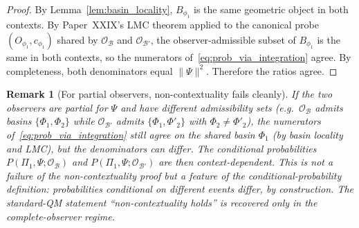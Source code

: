 \documentclass[12pt]{article}
\newtheorem{remark}[theorem]{Remark}
\newcommand{\Ocal}{\mathcal{O}}
\begin{document}
\begin{proof}
By Lemma~\ref{lem:basin_locality}, $B_{\phi_1}$ is the same geometric object in both contexts. By Paper~XXIX's LMC theorem applied to the canonical probe $(O_{\phi_1}, c_{\phi_1})$ shared by $\Ocal_{\mathcal{B}}$ and $\Ocal_{\mathcal{B}'}$, the observer-admissible subset of $B_{\phi_1}$ is the same in both contexts, so the numerators of~\eqref{eq:prob_via_integration} agree. By completeness, both denominators equal $\|\Psi\|^2$. Therefore the ratios agree.
\end{proof}

\begin{remark}[For partial observers, non-contextuality fails cleanly]\label{rem:partial_noncontextual}
If the two observers are \emph{partial} for $\Psi$ and have different admissibility sets (e.g.\ $\Ocal_\mathcal{B}$ admits basins $\{\Phi_1, \Phi_2\}$ while $\Ocal_{\mathcal{B}'}$ admits $\{\Phi_1, \Phi'_2\}$ with $\Phi_2 \neq \Phi'_2$), the numerators of~\eqref{eq:prob_via_integration} still agree on the shared basin $\Phi_1$ (by basin locality and LMC), but the denominators can differ. The conditional probabilities $P(\Pi_1, \Psi; \Ocal_{\mathcal{B}})$ and $P(\Pi_1, \Psi; \Ocal_{\mathcal{B}'})$ are then context-dependent. This is not a failure of the non-contextuality proof but a feature of the conditional-probability definition: probabilities conditional on different events differ, by construction. The standard-QM statement ``non-contextuality holds'' is recovered only in the complete-observer regime.
\end{remark}
\end{document}
